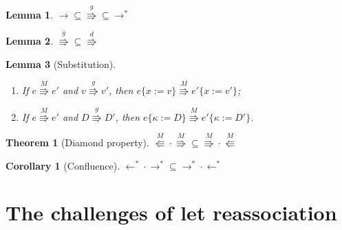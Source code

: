 \documentclass[a4paper, 11pt,titlepage, openright, twoside]{report}
\newcommand{\Par}[1]{\stackrel{#1}{\Rrightarrow}}
\newcommand{\Rap}[1]{\stackrel{#1}{\Lleftarrow}}
\newcommand{\subst}[2]{\{#1{:=}#2\}}
\newcommand{\+}{\enspace}
\newtheorem{corollary}{Corollary}
\newtheorem{lemma}{Lemma}
\newtheorem{theorem}{Theorem}
\begin{document}
\begin{lemma}
	${→} ⊆ {\Par{g}} ⊆ {→^*}$
\end{lemma}

\begin{lemma}
	${\Par{g}} ⊆ {\Par{d}}$
\end{lemma}

\begin{lemma}[Substitution]
	\item
	\begin{enumerate}
		\item If $e \Par{M} e'$ and $v \Par{g} v'$, then $e\subst{x}{v} \Par{M} e'\subst{x}{v'}$;
		\item If $e \Par{M} e'$ and $D \Par{g} D'$, then $e\subst{κ}{D} \Par{M} e'\subst{κ}{D'}$.
	\end{enumerate}
\end{lemma}

\begin{theorem}[Diamond property]
	${\Rap{M} · \Par{M}} ⊆ {\Par{M} · \Rap{M}}$
\end{theorem}

\begin{corollary}[Confluence]
	${←^* · →^*} ⊆ {→^* · ←^*}$
\end{corollary}


\section{The challenges of \textsf{let} reassociation}
\label{problet}
\end{document}
